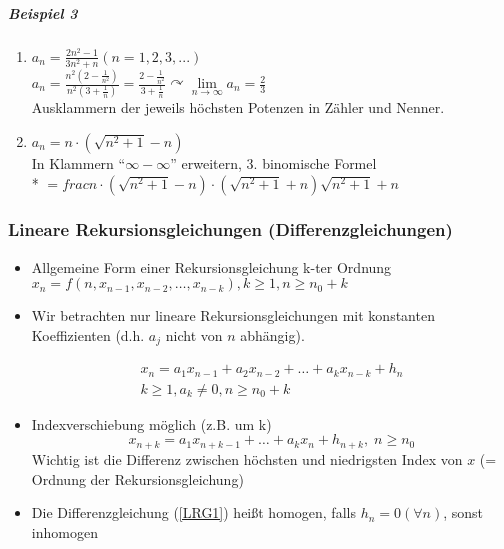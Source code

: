 \documentclass[a4paper]{scrartcl}
\begin{document}
\subparagraph{Beispiel 3}
\begin{enumerate}
\item $a_n = \frac{2n^2 -1}{3n^2+n} ( n= 1,2,3,...)$\\
$a_n = \frac{n^2(2-\frac{1}{n^2})}{n^2 (3 + \frac{1}{n})} = \frac{2- \frac{1}{n^2}}{3+ \frac{1}{n}} \curvearrowright \lim\limits_{n\to \infty} a_n = \frac{2}{3}$\\
Ausklammern der jeweils höchsten Potenzen in Zähler und Nenner.
\item $a_n = n \cdot ( \sqrt{n^2 +1} -n)$\\
In Klammern "`$\infty - \infty$"' erweitern, 3. binomische Formel\\*
$= frac{n \cdot ( \sqrt{n^2 +1} -n) \cdot (\sqrt{n^2 +1} +n)}{\sqrt{n^2+1} +n}$\\

\end{enumerate}

\subsubsection{Lineare Rekursionsgleichungen (Differenzgleichungen)}
\begin{itemize}
\item Allgemeine Form einer Rekursionsgleichung k-ter Ordnung $x_n = f (n, x_{n-1}, x_{n-2}, \dots,x_{n-k}),k \geq 1, n \geq n_0 + k$
\item Wir betrachten nur lineare Rekursionsgleichungen mit konstanten Koeffizienten (d.h. $a_j$ nicht von $n$ abhängig).

\begin{equation}\label{LRG1}
\begin{array}{c} x_n= a_1 x_{n-1} + a_2 x_{n-2} + \dots + a_k x_{n-k} + h_n \\
k \geq 1, a_k \neq 0, n \geq n_0 + k \end{array}
\end{equation}

\item Indexverschiebung möglich (z.B. um k)
\[ x_{n+k} = a_1 x_{n+k-1} + \dots + a_k x_n + h_{n+k}, \; n \geq n_0\]
Wichtig ist die Differenz zwischen höchsten und niedrigsten Index von $x$ (= Ordnung der Rekursionsgleichung)
\item  Die Differenzgleichung (\ref{LRG1}) heißt homogen, falls $h_n= 0(\forall n)$, sonst inhomogen
\end{itemize}
\end{document}
